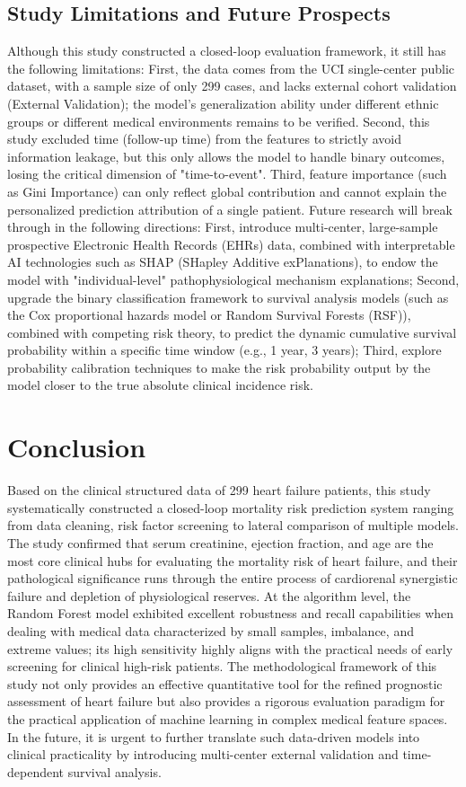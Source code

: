 \documentclass[12pt, a4paper]{article}
\begin{document}
\subsection{Study Limitations and Future Prospects}
Although this study constructed a closed-loop evaluation framework, it still has the following limitations: First, the data comes from the UCI single-center public dataset, with a sample size of only 299 cases, and lacks external cohort validation (External Validation); the model's generalization ability under different ethnic groups or different medical environments remains to be verified. Second, this study excluded time (follow-up time) from the features to strictly avoid information leakage, but this only allows the model to handle binary outcomes, losing the critical dimension of "time-to-event". Third, feature importance (such as Gini Importance) can only reflect global contribution and cannot explain the personalized prediction attribution of a single patient.
Future research will break through in the following directions: First, introduce multi-center, large-sample prospective Electronic Health Records (EHRs) data, combined with interpretable AI technologies such as SHAP (SHapley Additive exPlanations), to endow the model with "individual-level" pathophysiological mechanism explanations; Second, upgrade the binary classification framework to survival analysis models (such as the Cox proportional hazards model or Random Survival Forests (RSF)), combined with competing risk theory, to predict the dynamic cumulative survival probability within a specific time window (e.g., 1 year, 3 years); Third, explore probability calibration techniques to make the risk probability output by the model closer to the true absolute clinical incidence risk.

\section{Conclusion}
Based on the clinical structured data of 299 heart failure patients, this study systematically constructed a closed-loop mortality risk prediction system ranging from data cleaning, risk factor screening to lateral comparison of multiple models. The study confirmed that serum creatinine, ejection fraction, and age are the most core clinical hubs for evaluating the mortality risk of heart failure, and their pathological significance runs through the entire process of cardiorenal synergistic failure and depletion of physiological reserves.
At the algorithm level, the Random Forest model exhibited excellent robustness and recall capabilities when dealing with medical data characterized by small samples, imbalance, and extreme values; its high sensitivity highly aligns with the practical needs of early screening for clinical high-risk patients. The methodological framework of this study not only provides an effective quantitative tool for the refined prognostic assessment of heart failure but also provides a rigorous evaluation paradigm for the practical application of machine learning in complex medical feature spaces. In the future, it is urgent to further translate such data-driven models into clinical practicality by introducing multi-center external validation and time-dependent survival analysis.
\end{document}
